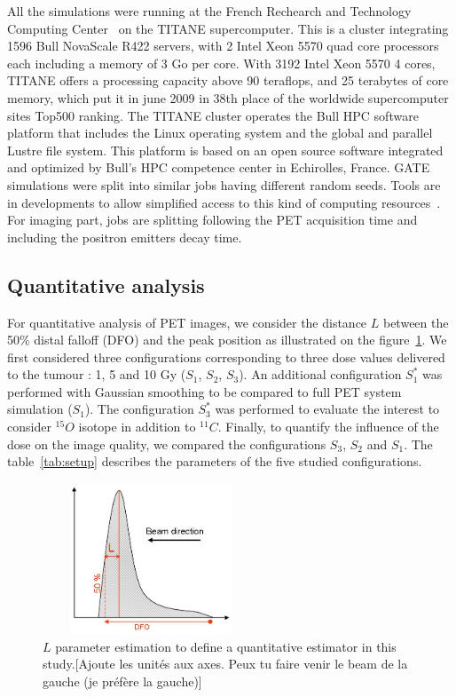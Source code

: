 \documentclass[11pt]{iopart}
\newcommand{\dsnote}[1]{{\color{green}[#1]}}
\begin{document}
All the simulations were running at the French Rechearch and
Technology Computing Center~\cite{CCRT} on the TITANE
supercomputer. This is a cluster integrating 1596 Bull NovaScale R422
servers, with 2 Intel Xeon 5570 quad core processors each including a
memory of 3 Go per core. With 3192 Intel Xeon 5570 4 cores, TITANE
offers a processing capacity above 90 teraflops, and 25 terabytes of
core memory, which put it in june 2009 in 38th place of the worldwide
supercomputer sites Top500 ranking. The TITANE cluster operates the
Bull HPC software platform that includes the Linux operating system
and the global and parallel Lustre file system. This platform is based
on an open source software integrated and optimized by Bull's HPC
competence center in Echirolles, France. GATE simulations were split
into similar jobs having different random seeds. Tools are in
developments to allow simplified access to this kind of computing
resources~\cite{Camarasu-Pop2010}.  For imaging part, jobs are
splitting following the PET acquisition time and including the
positron emitters decay time.

\subsection{Quantitative analysis}

For quantitative analysis of PET images, we consider the distance $L$
between the 50\% distal falloff (DFO) and the peak position as
illustrated on the figure~\ref{fig:dfo}. We first considered three
configurations corresponding to three dose values delivered to the
tumour : 1, 5 and 10 Gy ($S_{1}$, $S_{2}$, $S_{3}$). An additional
configuration $S_{1}^{*}$ was performed with Gaussian smoothing to be
compared to full PET system simulation ($S_{1}$). The configuration
$S_{3}^{*}$ was performed to evaluate the interest to consider
$^{15}O$ isotope in addition to $^{11}C$. Finally, to quantify the
influence of the dose on the image quality, we compared the
configurations $S_{3}$, $S_{2}$ and $S_{1}$. The table~\ref{tab:setup}
describes the parameters of the five studied configurations.

\begin{figure}[!h]
  \centering
  \includegraphics[width=65mm,height=45mm]{figures/dfo.jpg}
  \caption{$L$ parameter estimation to define a quantitative estimator
    in this study.\dsnote{Ajoute les unités aux axes. Peux tu faire
      venir le beam de la gauche (je préfère la gauche)}}
\label{fig:dfo}
\end{figure}
\end{document}
